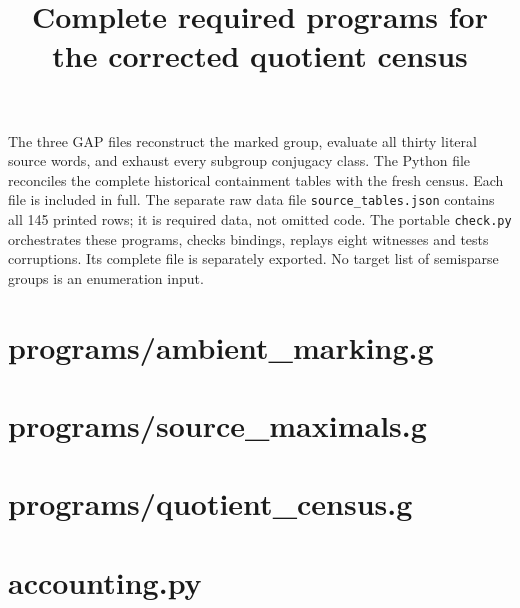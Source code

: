 \documentclass[10pt,a4paper]{article}
\title{Complete required programs for the corrected quotient census}
\author{}\date{}
\begin{document}
\maketitle
The three GAP files reconstruct the marked group, evaluate all thirty literal source words, and exhaust every subgroup conjugacy class. The Python file reconciles the complete historical containment tables with the fresh census. Each file is included in full. The separate raw data file \texttt{source\_tables.json} contains all 145 printed rows; it is required data, not omitted code. The portable \texttt{check.py} orchestrates these programs, checks bindings, replays eight witnesses and tests corruptions. Its complete file is separately exported. No target list of semisparse groups is an enumeration input.
\section*{programs/ambient\_marking.g}
\section*{programs/source\_maximals.g}
\section*{programs/quotient\_census.g}
\section*{accounting.py}
\end{document}
